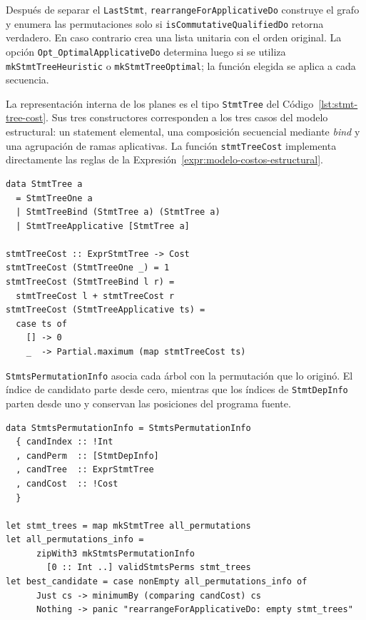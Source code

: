 Después de separar el \texttt{LastStmt}, \texttt{rearrangeForApplicativeDo} construye el grafo y enumera las permutaciones solo si \texttt{isCommutativeQualifiedDo} retorna verdadero. En caso contrario crea una lista unitaria con el orden original. La opción \texttt{Opt\_OptimalApplicativeDo} determina luego si se utiliza \texttt{mkStmtTreeHeuristic} o \texttt{mkStmtTreeOptimal}; la función elegida se aplica a cada secuencia.

La representación interna de los planes es el tipo \texttt{StmtTree} del Código~\ref{lst:stmt-tree-cost}. Sus tres constructores corresponden a los tres casos del modelo estructural: un statement elemental, una composición secuencial mediante \textit{bind} y una agrupación de ramas aplicativas. La función \texttt{stmtTreeCost} implementa directamente las reglas de la Expresión~\ref{expr:modelo-costos-estructural}.

\noindent\begin{minipage}{\textwidth}
\begin{lstlisting}[style=haskell,caption={Representación de planes y cálculo de su costo estructural.},label={lst:stmt-tree-cost}]
data StmtTree a
  = StmtTreeOne a
  | StmtTreeBind (StmtTree a) (StmtTree a)
  | StmtTreeApplicative [StmtTree a]

stmtTreeCost :: ExprStmtTree -> Cost
stmtTreeCost (StmtTreeOne _) = 1
stmtTreeCost (StmtTreeBind l r) =
  stmtTreeCost l + stmtTreeCost r
stmtTreeCost (StmtTreeApplicative ts) =
  case ts of
    [] -> 0
    _  -> Partial.maximum (map stmtTreeCost ts)
\end{lstlisting}
\end{minipage}

\texttt{StmtsPermutationInfo} asocia cada árbol con la permutación que lo originó. El índice de candidato parte desde cero, mientras que los índices de \texttt{StmtDepInfo} parten desde uno y conservan las posiciones del programa fuente.

\noindent\begin{minipage}{\textwidth}
\begin{lstlisting}[style=haskell,caption={Información conservada para evaluar y seleccionar candidatos.},label={lst:stmts-permutation-info}]
data StmtsPermutationInfo = StmtsPermutationInfo
  { candIndex :: !Int
  , candPerm  :: [StmtDepInfo]
  , candTree  :: ExprStmtTree
  , candCost  :: !Cost
  }

let stmt_trees = map mkStmtTree all_permutations
let all_permutations_info =
      zipWith3 mkStmtsPermutationInfo
        [0 :: Int ..] validStmtsPerms stmt_trees
let best_candidate = case nonEmpty all_permutations_info of
      Just cs -> minimumBy (comparing candCost) cs
      Nothing -> panic "rearrangeForApplicativeDo: empty stmt_trees"
\end{lstlisting}
\end{minipage}

